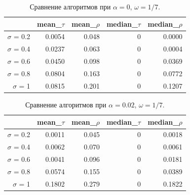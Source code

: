 \documentclass[specialist,
               substylefile = spbu.rtx,
               subf,href,colorlinks=true, 12pt]{disser}
\begin{document}
\begin{table}[hhh!]
\centering
\caption{Сравнение алгоритмов при $\alpha = 0$, $\omega = 1/7$.}
\begin{tabular}{rrrrr}
  \hline
 & mean\_$\tau$ & mean\_$\rho$ & median\_$\tau$ & median\_$\rho$ \\
  \hline
  $\sigma$ = 0.2 & 0.0054 & 0.048 & 0 & 0.0000 \\
  $\sigma$ = 0.4 & 0.0237 & 0.063 & 0 & 0.0004 \\
  $\sigma$ = 0.6 & 0.0450 & 0.098 & 0 & 0.0369 \\
  $\sigma$ = 0.8 & 0.0804 & 0.163 & 0 & 0.0772 \\
  $\sigma$ = 1 & 0.0815 & 0.201 & 0 & 0.1207 \\
   \hline
\end{tabular}
\label{tab:comp_tau1_pgram}
\end{table}

\begin{table}[hhh!]
\centering
\caption{Сравнение алгоритмов при $\alpha = 0.02$, $\omega = 1/7$.}
\begin{tabular}{rrrrr}
  \hline
 & mean\_$\tau$ & mean\_$\rho$ & median\_$\tau$ & median\_$\rho$ \\
  \hline
$\sigma$ = 0.2 & 0.0011 & 0.045 & 0 & 0.0018 \\
  $\sigma$ = 0.4 & 0.0062 & 0.070 & 0 & 0.0061 \\
  $\sigma$ = 0.6 & 0.0041 & 0.096 & 0 & 0.0181 \\
  $\sigma$ = 0.8 & 0.0574 & 0.155 & 0 & 0.0389 \\
  $\sigma$ = 1 & 0.1802 & 0.279 & 0 & 0.1822 \\
   \hline
\end{tabular}
\label{tab:comp_tau1_pgram2}
\end{table}
\end{document}
